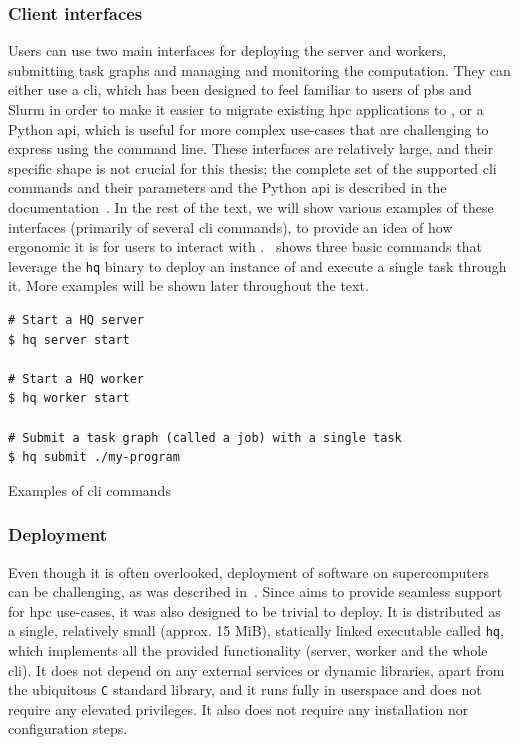 \subsubsection*{Client interfaces}
Users can use two main interfaces for deploying the \hyperqueue{} server and workers,
submitting task graphs and managing and monitoring the computation. They can either use a
\gls{cli}, which has been designed to feel familiar to users of
\gls{pbs} and Slurm in order to make it easier to migrate existing
\gls{hpc} applications to \hyperqueue{}, or a Python
\gls{api}, which is useful for more complex use-cases that are challenging to express
using the command line. These interfaces are relatively large, and their specific shape is not
crucial for this thesis; the complete set of the supported \gls{cli} commands and
their parameters and the Python \gls{api} is described in the \hyperqueue{}
documentation~\cite{hq_docs}. In the rest of the text, we will show various examples of
these interfaces (primarily of several \gls{cli} commands), to provide an idea of how
ergonomic it is for users to interact with \hyperqueue{}.~ shows
three basic commands that leverage the \texttt{hq} binary to deploy an instance of
\hyperqueue{} and execute a single task through it. More examples will be shown later
throughout the text.

\begin{listing}[h]
	\begin{verbatim}
# Start a HQ server
$ hq server start

# Start a HQ worker
$ hq worker start

# Submit a task graph (called a job) with a single task
$ hq submit ./my-program
	\end{verbatim}
	\caption{Examples of \hyperqueue{} \gls{cli} commands}
	\label{lst:hq-cli-commands}
\end{listing}

\subsubsection*{Deployment}
Even though it is often overlooked, deployment of software on supercomputers can be challenging, as
was described in~. Since \hyperqueue{} aims to provide seamless
support for \gls{hpc} use-cases, it was also designed to be trivial to deploy. It is
distributed as a single, relatively small (approx. 15 MiB), statically linked executable called
\texttt{hq}, which implements all the provided functionality (server, worker and the
whole \gls{cli}). It does not depend on any external services or dynamic libraries,
apart from the ubiquitous \texttt{C} standard library, and it runs fully in userspace
and does not require any elevated privileges. It also does not require any installation nor
configuration steps.


